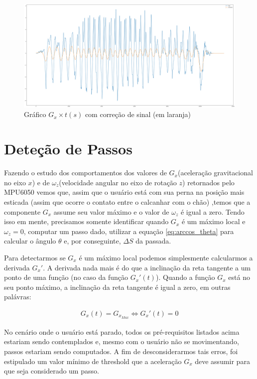 \documentclass{article}
\begin{document}
            \begin{figure}[h!]
                \centering
                \includegraphics[width=.8\textwidth]{img/Smoothed_data.png}
                \caption{Gráfico $G_x \times t(s)$ com correção de sinal (em laranja)}
                \label{img:smoothed_plot} 
            \end{figure}

        \section{Deteção de Passos}
        Fazendo o estudo dos comportamentos dos valores de $G_x$(aceleração gravitacional no eixo $x$) e de
        $\omega_z$(velocidade angular no eixo de rotação $z$) retornados pelo MPU6050 vemos que, assim
        que o usuário está com sua perna na posição mais esticada (assim que ocorre o contato entre o
        calcanhar com o chão) ,temos que a componente $G_x$  assume seu valor máximo e o valor de $\omega_z$ é
        igual a zero. Tendo isso em mente, precisamos somente identificar quando $G_x$ é um máximo local e
        $\omega_z=0$, computar um passo dado, utilizar a equação \ref{eq:arccos_theta} para calcular o ângulo 
        $\theta$ e, por conseguinte, $\Delta S$ da passada.

        Para detectarmos se $G_x$ é um máximo local podemos simplesmente calcularmos a derivada $G_x'$. A
        derivada nada mais é do que a inclinação da reta tangente a um ponto de uma função (no caso da função $G_x'(t)$).
        Quando a função $G_x$ está no seu ponto máximo, a inclinação da reta tangente é igual a zero, em
        outras palávras:

        \begin{align}
            G_x(t) = G_{x_{Max}} \iff G_x'(t) = 0
        \end{align}

        No cenário onde o usuário está parado, todos os pré-requisitos listados acima estariam sendo
        contemplados e, mesmo com o usuário não se movimentando, passos estariam sendo computados. A fim de
        desconsiderarmos tais erros, foi estipulado um valor mínimo de threshold que a aceleração $G_x$ deve
        assumir para que seja considerado  um passo.
\end{document}
